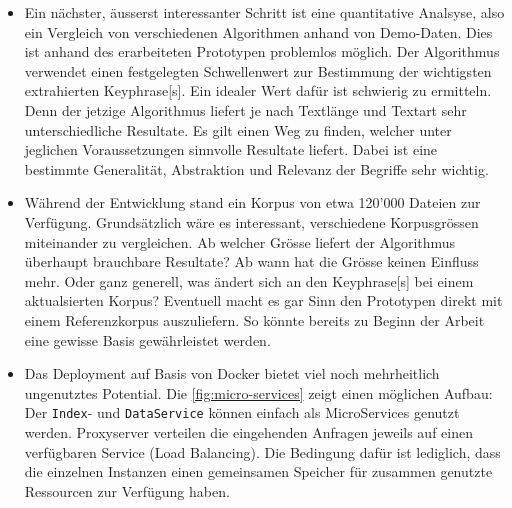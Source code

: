 \begin{itemize}
    \item Ein nächster, äusserst interessanter Schritt ist eine quantitative Analsyse, also ein Vergleich von verschiedenen Algorithmen anhand von Demo-Daten. Dies ist anhand des erarbeiteten Prototypen problemlos möglich. Der Algorithmus verwendet einen festgelegten Schwellenwert zur Bestimmung der wichtigsten extrahierten \gls{Keyphrase}[s]. Ein idealer Wert dafür ist schwierig zu ermitteln. Denn der jetzige Algorithmus liefert je nach Textlänge und Textart sehr unterschiedliche Resultate. Es gilt einen Weg zu finden, welcher unter jeglichen Voraussetzungen sinnvolle Resultate liefert. Dabei ist eine bestimmte Generalität, Abstraktion und Relevanz der Begriffe sehr wichtig.
    \item Während der Entwicklung stand ein Korpus von etwa 120'000 Dateien zur Verfügung. Grundsätzlich wäre es interessant, verschiedene Korpusgrössen miteinander zu vergleichen. Ab welcher Grösse liefert der Algorithmus überhaupt brauchbare Resultate? Ab wann hat die Grösse keinen Einfluss mehr. Oder ganz generell, was ändert sich an den \gls{Keyphrase}[s] bei einem aktualsierten Korpus? Eventuell macht es gar Sinn den Prototypen direkt mit einem Referenzkorpus auszuliefern. So könnte bereits zu Beginn der Arbeit eine gewisse Basis gewährleistet werden. %
    \item Das Deployment auf Basis von Docker bietet viel noch mehrheitlich ungenutztes Potential. Die \autoref{fig:micro-services} zeigt einen möglichen Aufbau: Der \texttt{Index}- und \texttt{DataService} können einfach als MicroServices genutzt werden. Proxyserver verteilen die eingehenden Anfragen jeweils auf einen verfügbaren Service (Load Balancing). Die Bedingung dafür ist lediglich, dass die einzelnen Instanzen einen gemeinsamen Speicher für zusammen genutzte Ressourcen zur Verfügung haben.
    

\end{itemize}
